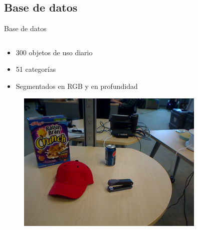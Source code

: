 \documentclass[]{beamer}
\begin{document}
\subsection{Base de datos}
\begin{frame}{Base de datos}



    \begin{columns}[t]
        \begin{column}{5cm}
            \begin{itemize}
                \item 300 objetos de uso diario
                \item 51 categorías
                \item Segmentados en RGB y en profundidad
            \end{itemize}

            \begin{figure}
                \includegraphics[width=0.8\textwidth]{img/base/scene.png}
            \end{figure}


\end{column}
\end{columns}
\end{frame}
\end{document}
